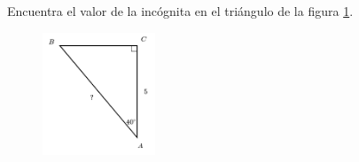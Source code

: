 Encuentra el valor de la incógnita en el triángulo de la figura \ref{fig:lados_functrig_19}.
\begin{figure}[H]
    \begin{center}
        \includegraphics[width=0.3\textwidth]{../images/lados_functrig_19.png}
    \end{center}
    \caption{}
    \label{fig:lados_functrig_19}
\end{figure}